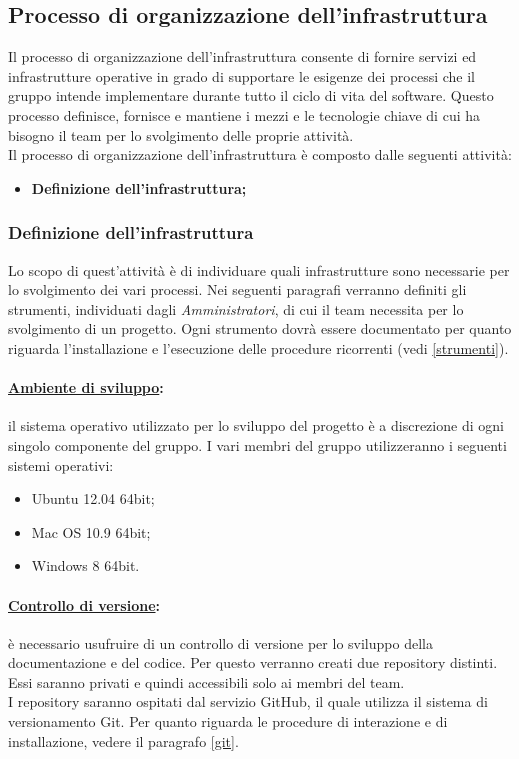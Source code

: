 \subsection{Processo di organizzazione dell'infrastruttura}
\label{organizzazioneinfrastruttura}
Il processo di organizzazione dell'infrastruttura consente di fornire servizi ed infrastrutture operative in grado di supportare le esigenze dei processi che il gruppo \authorName{} intende implementare durante tutto il ciclo di vita del software. Questo processo definisce, fornisce e mantiene i mezzi e le tecnologie chiave di cui ha bisogno il team per lo svolgimento delle proprie attività.\\
Il processo di organizzazione dell'infrastruttura è composto dalle seguenti attività:
\begin{itemize}
\item \textbf{Definizione dell'infrastruttura;}
\end{itemize}

\subsubsection{Definizione dell'infrastruttura}
\label{definizioneinfrastruttura}
Lo scopo di quest'attività è di individuare quali infrastrutture sono necessarie per lo svolgimento dei vari processi. Nei seguenti paragrafi verranno definiti gli strumenti, individuati dagli \textit{Amministratori}, di cui il team necessita per lo svolgimento di un progetto. Ogni strumento dovrà essere documentato per quanto riguarda l'installazione e l'esecuzione delle procedure ricorrenti (vedi \ref{strumenti}).

\paragraph{\underline{Ambiente di sviluppo}:} il sistema operativo utilizzato per lo sviluppo del progetto è a discrezione di ogni singolo componente del gruppo. I vari membri del gruppo utilizzeranno i seguenti sistemi operativi:
\begin{itemize}
\item Ubuntu 12.04 64bit;
\item Mac OS\g{} 10.9 64bit;
\item Windows\g{} 8 64bit.
\end{itemize}

\paragraph{\underline{Controllo di versione}:} è necessario usufruire di un controllo di versione per lo sviluppo della documentazione e del codice. Per questo verranno creati due repository\g{} distinti. Essi saranno privati e quindi accessibili solo ai membri del team.\\
I repository\g{} saranno ospitati dal servizio GitHub\g{}, il quale utilizza il sistema di versionamento Git\g{}. Per quanto riguarda le procedure di interazione e di installazione, vedere il paragrafo \ref{git}.

